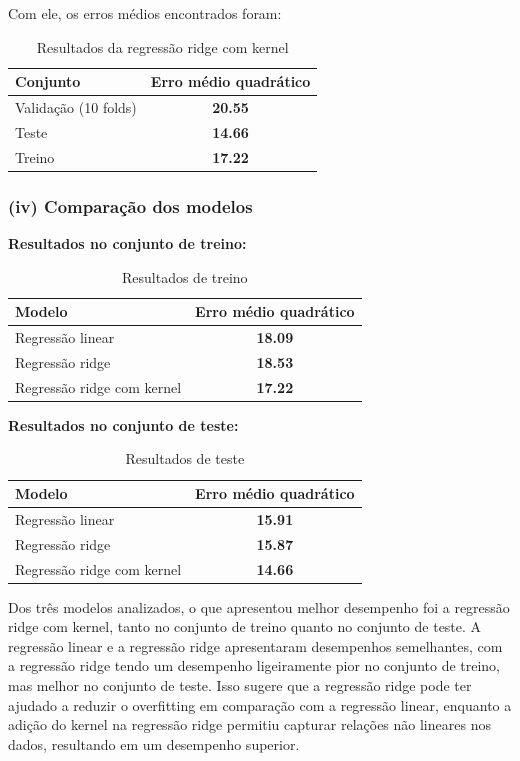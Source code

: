 Com ele, os erros médios encontrados foram:
\begin{table}[h!]
    \centering
    \begin{tabular}{|l|c|}
        \hline
        Conjunto             & Erro médio quadrático \\ \hline
        Validação (10 folds) & \textbf{20.55}        \\
        Teste                & \textbf{14.66}        \\
        Treino               & \textbf{17.22}        \\
        \hline
    \end{tabular}
    \caption{Resultados da regressão ridge com kernel}
\end{table}


\newpage
\subsubsection*{(iv) Comparação dos modelos}

\textbf{Resultados no conjunto de treino:}
\begin{table}[h!]
    \centering
    \begin{tabular}{|l|c|}
        \hline
        Modelo                     & Erro médio quadrático \\ \hline
        Regressão linear           & \textbf{18.09}        \\
        Regressão ridge            & \textbf{18.53}        \\
        Regressão ridge com kernel & \textbf{17.22}        \\
        \hline
    \end{tabular}
    \caption{Resultados de treino}
\end{table}

\textbf{Resultados no conjunto de teste:}
\begin{table}[h!]
    \centering
    \begin{tabular}{|l|c|}
        \hline
        Modelo                     & Erro médio quadrático \\ \hline
        Regressão linear           & \textbf{15.91}        \\
        Regressão ridge            & \textbf{15.87}        \\
        Regressão ridge com kernel & \textbf{14.66}        \\
        \hline
    \end{tabular}
    \caption{Resultados de teste}
\end{table}

Dos três modelos analizados, o que apresentou melhor desempenho foi a regressão ridge com kernel, tanto no conjunto de treino quanto no conjunto de teste. A
regressão linear e a regressão ridge apresentaram desempenhos semelhantes, com a regressão ridge tendo um desempenho ligeiramente pior no conjunto de treino,
mas melhor no conjunto de teste. Isso sugere que a regressão ridge pode ter ajudado a reduzir o overfitting em comparação com a regressão linear,
enquanto a adição do kernel na regressão ridge permitiu capturar relações não lineares nos dados, resultando em um desempenho superior.